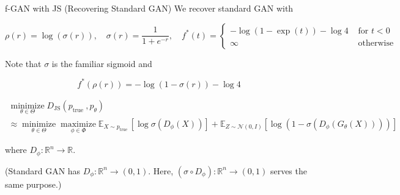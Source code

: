 \begin{frame}[allowframebreaks]

\begin{myconceptblock}{21.28}{f-GAN with JS (Recovering Standard GAN)}
    We recover standard GAN with

    $$
    \rho(r)=\log (\sigma(r)), \quad \sigma(r)=\frac{1}{1+e^{-r}}, \quad f^{*}(t)= \begin{cases}-\log (1-\exp (t))-\log 4 & \text { for } t<0 \\ \infty & \text { otherwise }\end{cases}
    $$

    Note that $\sigma$ is the familiar sigmoid and

    $$
    f^{*}(\rho(r))=-\log (1-\sigma(r))-\log 4
    $$

    $$
    \begin{gathered}
    \underset{\theta \in \Theta}{\operatorname{minimize}} D_{\mathrm{JS}}\left(p_{\text {true }}, p_{\theta}\right) \\
    \approx \underset{\theta \in \Theta}{\operatorname{minimize}} \underset{\phi \in \Phi}{\operatorname{maximize}} \mathbb{E}_{X \sim p_{\text {true }}}\left[\log \sigma\left(D_{\phi}(X)\right)\right]+\mathbb{E}_{Z \sim \mathcal{N}(0, I)}\left[\log \left(1-\sigma\left(D_{\phi}\left(G_{\theta}(X)\right)\right)\right)\right]
    \end{gathered}
    $$

    where $D_{\phi}: \mathbb{R}^{n} \rightarrow \mathbb{R}$.

    (Standard GAN has $D_{\phi}: \mathbb{R}^{n} \rightarrow(0,1)$. Here, $\left(\sigma \circ D_{\phi}\right): \mathbb{R}^{n} \rightarrow(0,1)$ serves the same purpose.)
\end{myconceptblock}

\end{frame}

